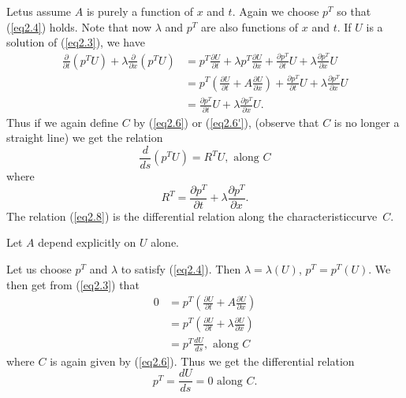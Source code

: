 \medskip
{} Let\pageoriginale us assume $A$ is
purely a function of $x$ and $t$. Again we choose $p^T$ so that (\ref{eq2.4})
holds. Note that now $\lambda$ and $p^T$ are also functions of $x$ and
$t$. If $U$ is a solution of (\ref{eq2.3}), we have 
\begin{align*}
\frac{\partial}{\partial t} (p^TU) + \lambda \frac{\partial}{\partial
  x} (p^TU) & = p^T \frac{\partial U }{\partial t} + \lambda p^T
\frac{\partial U}{\partial x} + \frac{\partial p^T}{\partial t} U +
\lambda  \frac{\partial p^T}{\partial x} U \\
& = p^T \left(\frac{\partial U}{\partial t} + A \frac{\partial U}{\partial
  x}\right) + \frac{\partial p^T}{\partial t} U + \lambda \frac{\partial
  p^T}{\partial x} U\\
& = \frac{\partial p^T}{\partial t} U+ \lambda \frac{\partial
  p^T}{\partial x} U.
 \end{align*}
Thus if we again define $C$ by (\ref{eq2.6}) or (\ref{eq2.6'}), (observe that $C$ is
no longer a straight line) we get the relation
\begin{equation*}
\frac{d}{ds} (p^TU) = R^TU, \text{ along }C\tag{2.8}\label{eq2.8}
\end{equation*}
where 
\begin{equation*}
R^T = \frac{\partial p^T}{\partial t} + \lambda \frac{\partial
  p^T}{\partial x}. \tag{2.9}\label{eq2.9}
\end{equation*}
The relation (\ref{eq2.8}) is the differential relation along the
characteristic\break curve~$C$.

\medskip
{} Let $A$ depend explicitly on $U$
alone.

Let us choose $p^T$ and $\lambda$ to satisfy (\ref{eq2.4}). Then $\lambda =
\lambda(U)$, $p^T = p^T (U)$. We then get from (\ref{eq2.3}) that 
\begin{align*}
0 & = p^T \left(\frac{\partial U}{\partial t} + A \frac{\partial
  U}{\partial x}\right)\\
& = p^T \left(\frac{\partial U}{\partial t} + \lambda \frac{\partial
  U}{\partial x}\right)\\
& = p^T \frac{d U}{ds}, \text{ along } C
\end{align*}
where $C$ is again given by (\ref{eq2.6}). Thus we get the differential
relation 
\begin{equation*}
p^T = \frac{dU}{ds} = 0 \text{ along } C.
\tag{2.10}\label{eq2.10}
\end{equation*}

